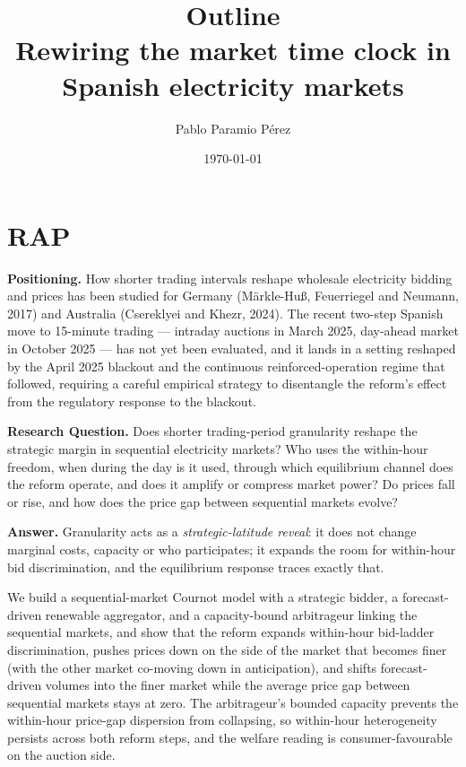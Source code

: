 \documentclass[11pt]{article}
\title{Outline\\
\large Rewiring the market time clock in Spanish electricity markets}
\author{Pablo Paramio P\'erez}
\date{\today}
\begin{document}
\maketitle

\section*{RAP}

\noindent\textbf{Positioning.} How shorter trading intervals reshape
wholesale electricity bidding and prices has been studied for Germany
(M\"arkle-Hu\ss, Feuerriegel and Neumann, 2017) and Australia
(Csereklyei and Khezr, 2024). The recent two-step Spanish move to
15-minute trading --- intraday auctions in March 2025, day-ahead
market in October 2025 --- has not yet been evaluated, and it lands
in a setting reshaped by the April 2025 blackout and the continuous
reinforced-operation regime that followed, requiring a careful
empirical strategy to disentangle the reform's effect from the
regulatory response to the blackout.

\noindent\textbf{Research Question.} Does shorter trading-period
granularity reshape the strategic margin in sequential electricity
markets? Who uses the within-hour freedom, when during the day is it
used, through which equilibrium channel does the reform operate, and
does it amplify or compress market power? Do prices fall or rise,
and how does the price gap between sequential markets evolve?

\noindent\textbf{Answer.} Granularity acts as a \emph{strategic-latitude
reveal}: it does not change marginal costs, capacity or who
participates; it expands the room for within-hour bid discrimination,
and the equilibrium response traces exactly that.

We build a sequential-market Cournot model with a strategic bidder, a
forecast-driven renewable aggregator, and a capacity-bound arbitrageur
linking the sequential markets, and show that the reform expands
within-hour bid-ladder discrimination, pushes prices down on the side
of the market that becomes finer (with the other market co-moving
down in anticipation), and shifts forecast-driven volumes into the
finer market while the average price gap between sequential markets
stays at zero. The arbitrageur's bounded capacity prevents the
within-hour price-gap dispersion from collapsing, so within-hour
heterogeneity persists across both reform steps, and the welfare
reading is consumer-favourable on the auction side.
\end{document}
